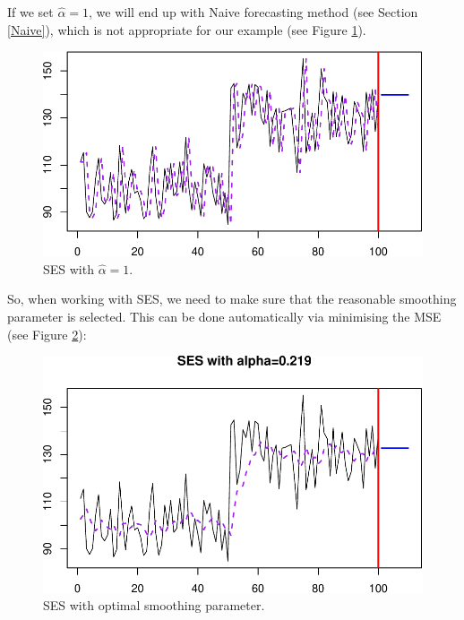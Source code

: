 \documentclass[]{book}
\newenvironment{Shaded}{\begin{snugshade}}{\end{snugshade}}
\newcommand{\DataTypeTok}[1]{\textcolor[rgb]{0.13,0.29,0.53}{#1}}
\newcommand{\DecValTok}[1]{\textcolor[rgb]{0.00,0.00,0.81}{#1}}
\newcommand{\KeywordTok}[1]{\textcolor[rgb]{0.13,0.29,0.53}{\textbf{#1}}}
\newcommand{\NormalTok}[1]{#1}
\newcommand{\OperatorTok}[1]{\textcolor[rgb]{0.81,0.36,0.00}{\textbf{#1}}}
\newcommand{\StringTok}[1]{\textcolor[rgb]{0.31,0.60,0.02}{#1}}
\theoremstyle{definition}
\theoremstyle{definition}
\theoremstyle{definition}
\theoremstyle{definition}
\theoremstyle{remark}
\begin{document}
If we set \(\hat{\alpha}=1\), we will end up with Naive forecasting method (see Section \ref{Naive}), which is not appropriate for our example (see Figure \ref{fig:SESExampleNaive}).

\begin{figure}
\centering
\includegraphics{Svetunkov--2022----ADAM_files/figure-latex/SESExampleNaive-1.pdf}
\caption{\label{fig:SESExampleNaive}SES with \(\hat{\alpha}=1\).}
\end{figure}

So, when working with SES, we need to make sure that the reasonable smoothing parameter is selected. This can be done automatically via minimising the MSE (see Figure \ref{fig:SESExample3}):

\begin{Shaded}
\end{Shaded}

\begin{figure}
\centering
\includegraphics{Svetunkov--2022----ADAM_files/figure-latex/SESExample3-1.pdf}
\caption{\label{fig:SESExample3}SES with optimal smoothing parameter.}
\end{figure}
\end{document}
